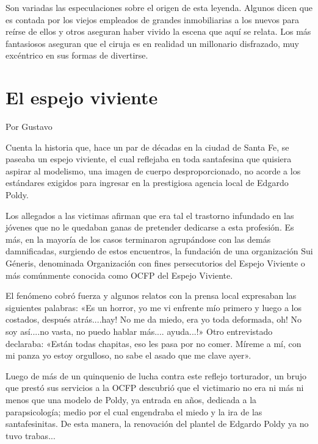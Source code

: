 \documentclass[11pt,twoside,openright,a5paper]{book}
\begin{document}
Son variadas las especulaciones sobre el origen de esta leyenda. Algunos dicen que es contada por los viejos empleados de grandes inmobiliarias a los nuevos para reírse de ellos y otros aseguran haber vivido la escena que aquí se relata. Los más fantasiosos aseguran que el ciruja es en realidad un millonario disfrazado, muy excéntrico en sus formas de divertirse.

\section*{El espejo viviente}

\begin{flushright}Por Gustavo\end{flushright}


Cuenta la historia que, hace un par de décadas en la ciudad de Santa Fe, se paseaba un espejo viviente, el cual reflejaba en toda santafesina que quisiera aspirar al modelismo, una imagen de cuerpo desproporcionado, no acorde a los estándares exigidos para ingresar en la prestigiosa agencia local de Edgardo Poldy.

Los allegados a las victimas afirman que era tal el trastorno infundado en las jóvenes que no le quedaban ganas de pretender dedicarse a esta profesión. Es más, en la mayoría de los casos terminaron agrupándose con las demás damnificadas, surgiendo de estos encuentros, la fundación de una organización Sui Géneris, denominada Organización con fines persecutorios del Espejo Viviente o más comúnmente conocida como OCFP del Espejo Viviente.

El fenómeno cobró fuerza y algunos relatos con la prensa local expresaban las siguientes palabras: «Es un horror, yo me vi enfrente mío primero y luego a los costados, después atrás....hay! No me da miedo, era yo toda deformada, oh! No soy así....no vasta, no puedo hablar más.... ayuda...!» Otro entrevistado declaraba: «Están todas chapitas, eso les pasa por no comer. Míreme a mí, con mi panza yo estoy orgulloso, no sabe el asado que me clave ayer».

Luego de más de un quinquenio de lucha contra este reflejo torturador, un brujo que prestó sus servicios a la OCFP descubrió que el victimario no era ni más ni menos que una modelo de Poldy, ya entrada en años, dedicada a la parapsicología; medio por el cual engendraba el miedo y la ira de las santafesinitas. De esta manera, la renovación del plantel de Edgardo Poldy ya no tuvo trabas...
\end{document}
